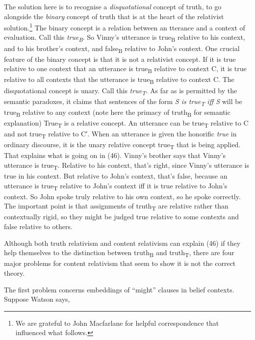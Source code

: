 \documentclass[
  10pt,
  letterpaper,
  DIV=11,
  numbers=noendperiod,
  twoside]{scrartcl}
\begin{document}
The solution here is to recognise a \emph{disquotational} concept of
truth, to go alongside the \emph{binary} concept of truth that is at the
heart of the relativist solution.\footnote{We are grateful to John
  Macfarlane for helpful correspondence that influenced what follows.}
The binary concept is a relation between an tterance and a context of
evaluation. Call this \emph{true\textsubscript{B}}. So Vinny's utterance
is true\textsubscript{B} relative to his context, and to his brother's
context, and false\textsubscript{B} relative to John's context. One
crucial feature of the binary concept is that it is not a relativist
concept. If it is true relative to one context that an utterance is
true\textsubscript{B} relative to context C, it is true relative to all
contexts that the utterance is true\textsubscript{B} relative to context
C. The disquotational concept is unary. Call this
\emph{true\textsubscript{T}}. As far as is permitted by the semantic
paradoxes, it claims that sentences of the form \emph{S is
true\textsubscript{T}} \emph{iff S} will be true\textsubscript{B}
relative to any context (note here the primacy of truth\textsubscript{B}
for semantic explanation) True\textsubscript{T} is a relative concept.
An utterance can be true\textsubscript{T} relative to C and not
true\textsubscript{T} relative to C′. When an utterance is given the
honorific \emph{true} in ordinary discourse, it is the unary relative
concept true\textsubscript{T} that is being applied. That explains what
is going on in (46). Vinny's brother says that Vinny's utterance is
true\textsubscript{T}. Relative to his context, that's right, since
Vinny's utterance is true in his context. But relative to John's
context, that's false, because an utterance is true\textsubscript{T}
relative to John's context iff it is true relative to John's context. So
John spoke truly relative to his own context, so he spoke correctly. The
important point is that assignments of truth\textsubscript{T} are
relative rather than contextually rigid, so they might be judged true
relative to some contexts and false relative to others.

Although both truth relativism and content relativism can explain (46)
if they help themselves to the distinction between
truth\textsubscript{B} and truth\textsubscript{T}, there are four major
problems for content relativism that seem to show it is not the correct
theory.

The first problem concerns embeddings of ``might'' clauses in belief
contexts. Suppose Watson says,
\end{document}
